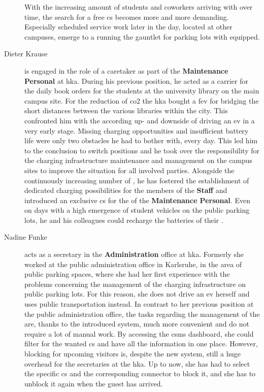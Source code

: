 \begin{description}
    With the increasing amount of students and coworkers arriving with  over time, the search for a free \acrshort{cs} becomes more and more demanding. 
    Especially scheduled service work later in the day, located at other campuses, emerge to a running the gauntlet for parking lots with  equipped. 
    \item[Dieter Krause] is engaged in the role of a caretaker as part of the \textbf{Maintenance Personal} at \acrshort{hka}. During his previous position, he acted as a carrier for the daily book orders for the students at the university library on the main campus site. 
    For the reduction of \acrshort{co2} the \acrshort{hka} bought a \acrshort{fev} for bridging the short distances between the various libraries within the city. 
    This confronted him with the according up- and downside of driving an \acrshort{ev} in a very early stage. 
    Missing charging opportunities and insufficient battery life were only two obstacles he had to bother with, every day. 
    This led him to the conclusion to switch positions and he took over the responsibility for the charging infrastructure maintenance and management on the campus sites to improve the situation for all involved parties. 
    Alongside the continuously increasing number of , he has fostered the establishment of dedicated charging possibilities for the members of the \textbf{Staff} and introduced an exclusive \acrshort{cs} for the  of the \textbf{Maintenance Personal}. 
    Even on days with a high emergence of student vehicles on the public parking lots, he and his colleagues could recharge the batteries of their . 
    \item[Nadine Funke] acts as a secretary in the \textbf{Administration} office at \acrshort{hka}. Formerly she worked at the public administration office in Karlsruhe, in the area of public parking spaces, where she had her first experience with the problems concerning the management of the charging infrastructure on public parking lots. 
    For this reason, she does not drive an \acrshort{ev} herself and uses public transportation instead. In contrast to her previous position at the public administration office, the tasks regarding the management of the  are, thanks to the introduced system, much more convenient and do not require a lot of manual work. 
    By accessing the \acrshort{csms} dashboard, she could filter for the wanted \acrshort{cs} and have all the information in one place. 
    However, blocking  for upcoming visitors is, despite the new system, still a huge overhead for the secretaries at the \acrshort{hka}. 
    Up to now, she has had to select the specific \acrshort{cs} and the corresponding connector to block it, and she has to unblock it again when the guest has arrived.
\end{description}

